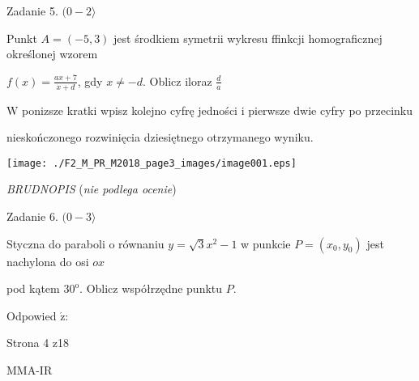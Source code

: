 \documentclass[a4paper,12pt]{article}
\begin{document}
Zadanie 5. $(0-2\rangle$

Punkt $A=(-5,3)$ jest środkiem symetrii wykresu ffinkcji homograficznej określonej wzorem

$f(x)=\displaystyle \frac{ax+7}{x+d}$, gdy $x\neq-d$. Oblicz iloraz $\displaystyle \frac{d}{a}$

$\mathrm{W}$ ponizsze kratki wpisz kolejno cyfrę jedności i pierwsze dwie cyfry po przecinku

nieskończonego rozwinięcia dziesiętnego otrzymanego wyniku.
\begin{center}
\texttt{[image: ./F2\_M\_PR\_M2018\_page3\_images/image001.eps]}
\end{center}
{\it BRUDNOPIS} ({\it nie podlega ocenie})

Zadanie 6. $(0-3\rangle$

Styczna do paraboli o równaniu $y=\sqrt{3}x^{2}-1$ w punkcie $P=(x_{0},y_{0})$ jest nachylona do osi $ox$

pod kątem $30^{\mathrm{o}}$. Oblicz współrzędne punktu $P.$

Odpowied $\acute{\mathrm{z}}$:

Strona 4 z18

MMA-IR
\end{document}
